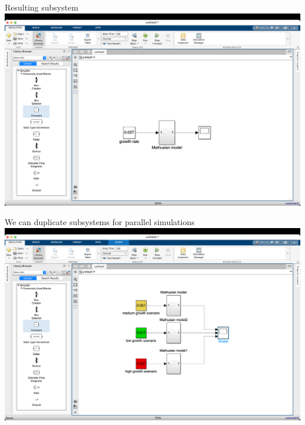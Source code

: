 \begin{frame}{Resulting subsystem}
    \hspace*{-11mm}
    \includegraphics[width=\paperwidth]{lesson_2/images/simulink_screen_29.png}
\end{frame}

\begin{frame}{We can duplicate subsystems for parallel simulations}
    \hspace*{-11mm}
    \includegraphics[width=\paperwidth]{lesson_2/images/simulink_screen_30.png}
\end{frame}

